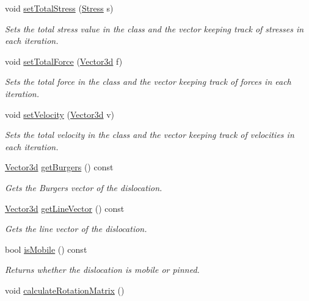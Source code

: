 \begin{DoxyCompactItemize}
void \hyperlink{classDislocation_acc1b0c77cc1150cc7d6d7bc098acb610}{set\-Total\-Stress} (\hyperlink{classStress}{Stress} s)
\begin{DoxyCompactList}\small\item\em Sets the total stress value in the class and the vector keeping track of stresses in each iteration. \end{DoxyCompactList}\item 
void \hyperlink{classDislocation_aebe391b1ed71cd98b506abbdd493fc31}{set\-Total\-Force} (\hyperlink{classVector3d}{Vector3d} f)
\begin{DoxyCompactList}\small\item\em Sets the total force in the class and the vector keeping track of forces in each iteration. \end{DoxyCompactList}\item 
void \hyperlink{classDislocation_aeb55f4d1364d2e33891e41868592c629}{set\-Velocity} (\hyperlink{classVector3d}{Vector3d} v)
\begin{DoxyCompactList}\small\item\em Sets the total velocity in the class and the vector keeping track of velocities in each iteration. \end{DoxyCompactList}\item 
\hyperlink{classVector3d}{Vector3d} \hyperlink{classDislocation_a9eb3cc78d08d26a29d5f318a33f6065e}{get\-Burgers} () const 
\begin{DoxyCompactList}\small\item\em Gets the Burgers vector of the dislocation. \end{DoxyCompactList}\item 
\hyperlink{classVector3d}{Vector3d} \hyperlink{classDislocation_a8ba2d0d68c7b335e5c75b7498b33803d}{get\-Line\-Vector} () const 
\begin{DoxyCompactList}\small\item\em Gets the line vector of the dislocation. \end{DoxyCompactList}\item 
bool \hyperlink{classDislocation_a741fe1113b1693a6b2f3ad364e9508fe}{is\-Mobile} () const 
\begin{DoxyCompactList}\small\item\em Returns whether the dislocation is mobile or pinned. \end{DoxyCompactList}\item 
void \hyperlink{classDislocation_aa249f1f46486fd183757ed5049586e73}{calculate\-Rotation\-Matrix} ()

\end{DoxyCompactItemize}
